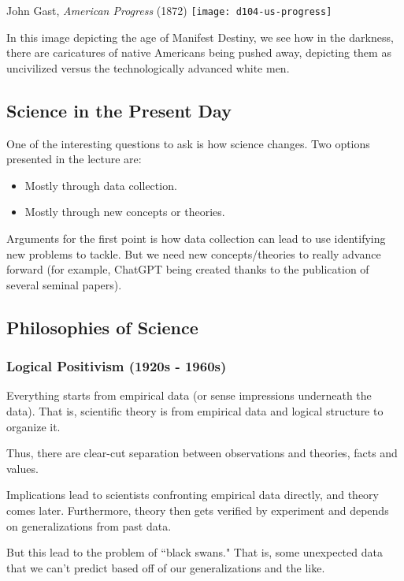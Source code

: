\documentclass[openany]{book}
\begin{document}
\begin{figurebox}[]{John Gast, \textit{American Progress} (1872)}
	\centering\texttt{[image: d104-us-progress]}
\end{figurebox}

In this image depicting the age of Manifest Destiny, we see how in the darkness, there are caricatures of native Americans being pushed away, depicting them as uncivilized versus the technologically advanced white men.

\subsection{Science in the Present Day}
One of the interesting questions to ask is how science changes. Two options presented in the lecture are:
\begin{itemize}
	\item Mostly through data collection.
	\item Mostly through new concepts or theories.
\end{itemize}

Arguments for the first point is how data collection can lead to use identifying new problems to tackle. But we need new concepts/theories to really advance forward (for example, ChatGPT being created thanks to the publication of several seminal papers).

\subsection{Philosophies of Science}
\subsubsection{Logical Positivism (1920s - 1960s)}
\begin{defn}
	Everything starts from empirical data (or sense impressions underneath the data). That is, scientific theory is from empirical data and logical structure to organize it.
\end{defn}

Thus, there are clear-cut separation between observations and theories, facts and values.

Implications lead to scientists confronting empirical data directly, and theory comes later. Furthermore, theory then gets verified by experiment and depends on generalizations from past data.

But this lead to the problem of ``black swans." That is, some unexpected data that we can't predict based off of our generalizations and the like.
\end{document}
